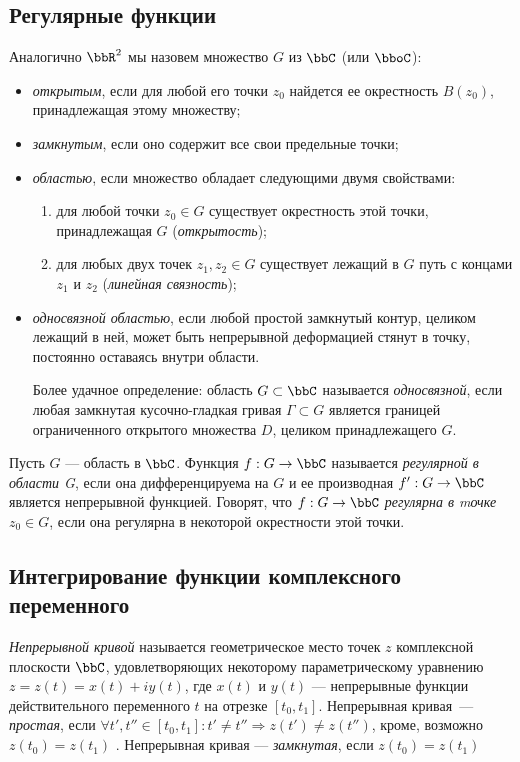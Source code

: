\subsection{Регулярные функции}
Аналогично $\bbR^2$ мы назовем множество $G$ из $\bbC$ (или $\bboC$):
\begin{itemize}
\item
\textit{открытым}, если для любой его точки $z_0$ найдется ее окрестность $B(z_0)$, принадлежащая этому множеству;
\item
\textit{замкнутым}, если оно содержит все свои предельные точки;
\item 
\textit{областью}, если множество обладает следующими двумя свойствами:
\begin{enumerate}
\item 
для любой точки $z_0 \in G$ существует окрестность этой точки, принадлежащая $G$ (\textit{открытость});
\item 
для любых двух точек $z_1,z_2 \in G$ существует лежащий в $G$ путь с концами $z_1$ и $z_2$ (\textit{линейная связность});
\end{enumerate}
\item
\textit{односвязной областью}, если любой простой замкнутый контур, целиком лежащий в ней, может быть непрерывной деформацией стянут в точку, постоянно оставаясь внутри области. 

Более удачное определение: область $G\subset \bbC$ называется \textit{односвязной}, если любая замкнутая кусочно-гладкая гривая $\Gamma \subset G$ является границей ограниченного открытого множества $D$, целиком принадлежащего $G$.
\end{itemize}

\begin{leftbar}
\begin{defn}
Пусть $G$ --- область в $\bbC$. Функция $f: G \to \bbC$ называется \textit{регулярной в области G}, если она дифференцируема на $G$ и ее производная $f' : G \to \bbC$ является непрерывной функцией. Говорят, что $f : G \to \bbC$ \textit{регулярна в mочке} $z_0 \in G$, если она регулярна в некоторой окрестности этой точки. 
\end{defn}
\end{leftbar}

\subsection{Интегрирование функции комплексного переменного}
\begin{defn}
\textit{Непрерывной кривой} называется геометрическое место точек $z$ комплексной плоскости $\bbC$, удовлетворяющих некоторому параметрическому уравнению $z=z(t) = x(t) + iy(t)$, где $x(t)$ и $y(t)$ --- непрерывные функции действительного переменного $t$ на отрезке $[t_0,t_1]$. Непрерывная кривая~--- \textit{простая}, если $\forall t',t'' \in [t_0,t_1]: t'\ne t'' \Rightarrow z(t') \ne z(t'')  $, кроме, возможно $z(t_0) = z(t_1)$ . Непрерывная кривая --- \textit{замкнутая}, если  $z(t_0) = z(t_1)$ 
\end{defn}

